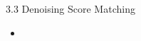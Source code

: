\begin{frame}{3.3 Denoising Score Matching}
    \begin{itemize}
        \item
    \end{itemize}
\end{frame}
